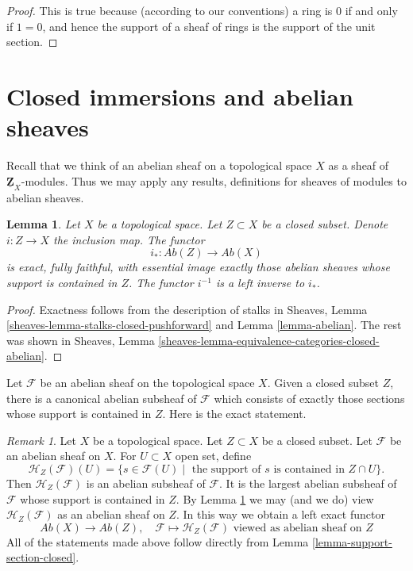 \documentclass{stacks-project}
\theoremstyle{plain}
\newtheorem{lemma}[subsection]{Lemma}
\theoremstyle{definition}
\theoremstyle{remark}
\newtheorem{remark}[subsection]{Remark}
\numberwithin{equation}{subsection}
\begin{document}
\begin{proof}
This is true because (according to our conventions)
a ring is $0$ if and only if
$1 = 0$, and hence the support of a sheaf of rings
is the support of the unit section.
\end{proof}






\section{Closed immersions and abelian sheaves}
\label{section-closed-immersions}

\noindent
Recall that we think of an abelian sheaf on a topological space $X$ as a
sheaf of $\underline{\mathbf{Z}}_X$-modules. Thus we may apply any results,
definitions for sheaves of modules to abelian sheaves.

\begin{lemma}
\label{lemma-i-star-exact}
Let $X$ be a topological space. Let $Z \subset X$ be a closed subset.
Denote $i : Z \to X$ the inclusion map. The functor
$$
i_* : \textit{Ab}(Z) \longrightarrow \textit{Ab}(X)
$$
is exact, fully faithful, with essential image exactly those
abelian sheaves whose support is contained in $Z$. The functor $i^{-1}$
is a left inverse to $i_*$.
\end{lemma}

\begin{proof}
Exactness follows from the description of
stalks in Sheaves, Lemma \ref{sheaves-lemma-stalks-closed-pushforward}
and Lemma \ref{lemma-abelian}. The rest was shown in
Sheaves, Lemma \ref{sheaves-lemma-equivalence-categories-closed-abelian}.
\end{proof}

\noindent
Let $\mathcal{F}$ be an abelian sheaf on the topological space $X$. Given
a closed subset $Z$, there is a canonical abelian subsheaf of $\mathcal{F}$
which consists of exactly those sections whose support is contained in $Z$.
Here is the exact statement.

\begin{remark}
\label{remark-sections-support-in-closed}
Let $X$ be a topological space. Let $Z \subset X$ be a closed subset.
Let $\mathcal{F}$ be an abelian sheaf on $X$. For $U \subset X$ open set, define
$$
\mathcal{H}_Z(\mathcal{F})(U) =
\{s \in \mathcal{F}(U) \mid
\text{ the support of }s\text{ is contained in }Z \cap U\}.
$$
Then $\mathcal{H}_Z(\mathcal{F})$ is an abelian subsheaf of $\mathcal{F}$.
It is the largest abelian subsheaf of $\mathcal{F}$ whose support is
contained in $Z$. By Lemma \ref{lemma-i-star-exact} we may (and we do)
view $\mathcal{H}_Z(\mathcal{F})$ as an abelian sheaf on $Z$.
In this way we obtain a left exact functor
$$
\textit{Ab}(X) \longrightarrow \textit{Ab}(Z),\quad
\mathcal{F} \longmapsto \mathcal{H}_Z(\mathcal{F})
\text{ viewed as abelian sheaf on }Z
$$
All of the statements made above follow directly from
Lemma \ref{lemma-support-section-closed}.
\end{remark}
\end{document}
